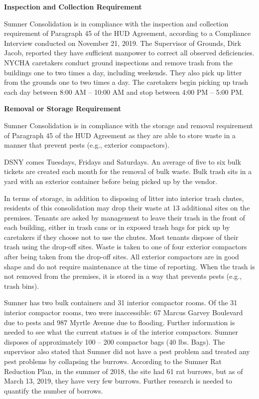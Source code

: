 


\textbf{Inspection and Collection Requirement}

Sumner Consolidation is in compliance with the inspection and collection requirement of  Paragraph 45 of the HUD Agreement, according to a Compliance Interview conducted on November 21, 2019. The Supervisor of Grounds, Dirk Jacob, reported they have sufficient manpower to correct all observed deficiencies. NYCHA caretakers conduct ground inspections and remove trash from the buildings one to two times a day, including weekends. They also pick up litter from the grounds one to two times a day. The caretakers begin picking up trash each day between 8:00 AM -- 10:00 AM and stop between 4:00 PM -- 5:00 PM. 



\textbf{Removal or Storage Requirement}

Sumner Consolidation is in compliance with the storage and removal requirement of Paragraph 45 of the HUD Agreement as they are able to store waste in a manner that prevent pests (e.g., exterior compactors).

 

DSNY comes Tuesdays, Fridays and Saturdays. An average of five to six bulk tickets are created each month for the removal of bulk waste. Bulk trash sits in a yard with an exterior container before being picked up by the vendor.



In terms of storage, in addition to disposing of litter into interior trash chutes, residents of this consolidation may drop their waste at 13 additional sites on the premises. Tenants are asked by management to leave their trash in the front of each building, either in trash cans or in exposed trash bags for pick up by caretakers if they choose not to use the chutes. Most tenants dispose of their trash using the drop-off sites. Waste is taken to one of four exterior compactors after being taken from the drop-off sites. All exterior compactors are in good shape and do not require maintenance at the time of reporting. When the trash is not removed from the premises, it is stored in a way that prevents pests (e.g., trash bins).



Sumner has two bulk containers and 31 interior compactor rooms. Of the 31 interior compactor rooms, two were inaccessible: 67 Marcus Garvey Boulevard due to pests and 987 Myrtle Avenue due to flooding. Further information is needed to see what the current statues is of the interior compactors. Sumner disposes of approximately 100 -- 200 compactor bags (40 lbs. Bags). The supervisor also stated that Sumner did not have a pest problem and treated any pest problems by collapsing the burrows. According to the Sumner Rat Reduction Plan, in the summer of 2018, the site had 61 rat burrows, but as of March 13, 2019, they have very few burrows. Further research is needed to quantify the number of borrows.



